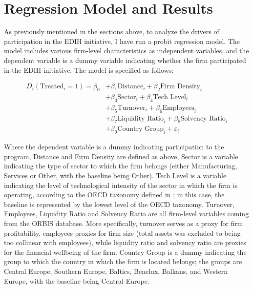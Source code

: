 \documentclass[12pt]{report}
\begin{document}
\section{Regression Model and Results}

\par As previously mentioned in the sections above, to analyze the drivers of participation in the EDIH initiative, I have run a probit regression model. The model includes various firm-level characteristics as independent variables, and the dependent variable is a dummy variable indicating whether the firm participated in the EDIH initiative. The model is specified as follows:

\begin{equation}
    \begin{split}
        D_{i}(\text{Treated}_{i} = 1) = \beta_{0} &+ \beta_{1} \text{Distance}_{i} + \beta_{2} \text{Firm Density}_{i} \\
        &+ \beta_{3} \text{Sector}_{i} + \beta_{4} \text{Tech Level}_{i} \\
        &+ \beta_{5} \text{Turnover}_{i} + \beta_{6} \text{Employees}_{i} \\
        &+ \beta_{7} \text{Liquidity Ratio}_{i} + \beta_{8} \text{Solvency Ratio}_{i} \\
        &+ \beta_{9} \text{Country Group}_{i} + \varepsilon_{i}
    \end{split}
\end{equation}


\par Where the dependent variable is a dummy indicating participation to the program, Distance and Firm Density are defined as above, Sector is a variable indicating the type of sector to which the firm belongs (either Manufacturing, Services or Other, with the baseline being Other). Tech Level is a variable indicating the level of technological intensity of the sector in which the firm is operating, according to the OECD taxonomy defined in \cite{oecdclassification}; in this case, the baseline is represented by the lowest level of the OECD taxonomy. Turnover, Employees, Liquidity Ratio and Solvency Ratio are all firm-level variables coming from the ORBIS database. More specifically, turnover serves as a proxy for firm profitability, employees proxies for firm size (total assets was excluded to being too collinear with employees), while liquidity ratio and solvency ratio are proxies for the financial wellbeing of the firm. Country Group is a dummy indicating the group to which the country in which the firm is located belongs; the groups are Central Europe, Southern Europe, Baltics, Benelux, Balkans, and Western Europe, with the baseline being Central Europe.
\end{document}
